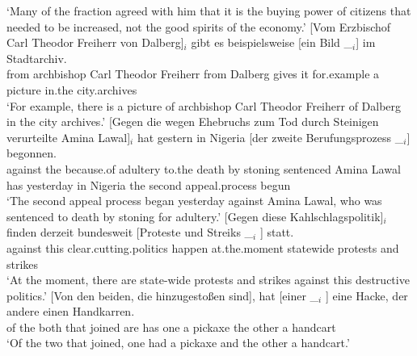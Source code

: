 \begin{sloppypar}
\glt `Many of the fraction agreed with him that it is the buying power of citizens that needed to be increased, not the good spirits of the economy.'
\ex\label{bsp-von-erzbischof-bilder} 
\gll {}[Vom Erzbischof Carl Theodor Freiherr von Dalberg]$_i$ gibt es beispielsweise [ein Bild \_$_i$]
        im Stadtarchiv.\footnotemark\\
	{}\spacebr{}from archbishop Carl Theodor Freiherr from Dalberg gives it for.example \spacebr{}a picture {} in.the city.archives\\
\glt `For example, there is a picture of archbishop Carl Theodor Freiherr of Dalberg in the city archives.'
\ex 
\gll {}[Gegen die wegen Ehebruchs zum Tod durch Steinigen verurteilte Amina Lawal]$_i$ hat gestern in Nigeria
    [der zweite Berufungsprozess \_$_i$] begonnen.\footnotemark\\
	{}\spacebr{}against the because.of adultery to.the death by stoning sentenced Amina Lawal has yesterday in Nigeria \spacebr{}the second appeal.process {} begun\\
\glt `The second appeal process began yesterday against Amina Lawal, who was sentenced to death by stoning for adultery.'
\ex 
\gll {}[Gegen diese Kahlschlagspolitik]$_i$ finden derzeit bundesweit [Proteste und Streiks \_$_i$ ] statt.\footnotemark\\
	 {}\spacebr{}against this clear.cutting.politics happen at.the.moment statewide \spacebr{}protests and strikes {} {} \prt{}\\
\glt `At the moment, there are state-wide protests and strikes against this destructive politics.'
\ex 
\gll {}[Von den beiden, die hinzugestoßen sind], hat [einer        \_$_i$ ] eine Hacke, der andere einen Handkarren.\footnotemark\\
	 {}\spacebr{}of the both that joined are has \spacebr{}one {}    {}  a pickaxe   the other a handcart\\
\glt `Of the two that joined, one had a pickaxe and the other a handcart.'

\end{sloppypar}
